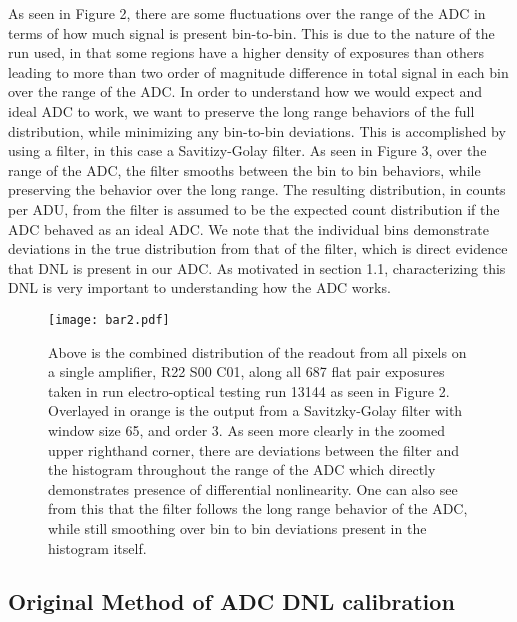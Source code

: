 \documentclass[11pt, letterpaper]{article}
\begin{document}
As seen in Figure 2, there are some fluctuations over the range of the ADC in terms of how much signal is present bin-to-bin. 
This is due to the nature of the run used, in that some regions have a higher density of exposures than others leading to more than two order of magnitude difference in total signal in each bin over the range of the ADC. 
In order to understand how we would expect and ideal ADC to work, we want to preserve the long range behaviors of the full distribution, while minimizing any bin-to-bin deviations. 
This is accomplished by using a filter, in this case a Savitizy-Golay filter. 
As seen in Figure 3, over the range of the ADC, the filter smooths between the bin to bin behaviors, while preserving the behavior over the long range. 
The resulting distribution, in counts per ADU, from the filter is assumed to be the expected count distribution if the ADC behaved as an ideal ADC.  
We note that the individual bins demonstrate deviations in the true distribution from that of the filter, which is direct evidence that DNL is present in our ADC. 
As motivated in section 1.1, characterizing this DNL is very important to understanding how the ADC works. 

\begin{figure}
	\texttt{[image: bar2.pdf]}
	\caption{Above is the combined distribution of the readout from all pixels on a single amplifier, R22 S00 C01, along all 687 flat pair exposures taken in run electro-optical testing run 13144 as seen in Figure 2. Overlayed in orange is the output from a Savitzky-Golay filter with window size 65, and order 3. As seen more clearly in the zoomed upper righthand corner, there are deviations between the filter and the histogram throughout the range of the ADC which directly demonstrates presence of differential nonlinearity. One can also see from this that the filter follows the long range behavior of the ADC, while still smoothing over bin to bin deviations present in the histogram itself.}
\end{figure}


\subsection{Original Method of ADC DNL calibration}
\indent
\end{document}

